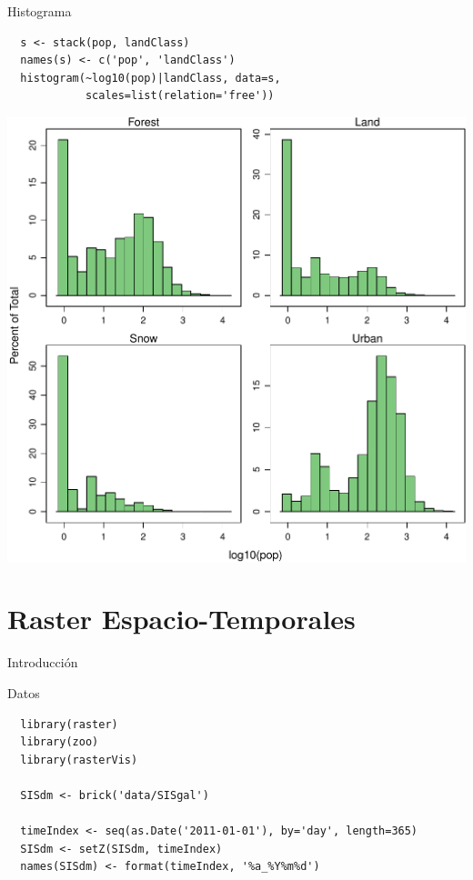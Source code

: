 \documentclass[xcolor={usenames,svgnames,dvipsnames}]{beamer}
\begin{document}
\begin{frame}[fragile,label=sec-3-7]{Histograma}
 \lstset{language=R,label= ,caption= ,numbers=none}
\begin{lstlisting}
  s <- stack(pop, landClass)
  names(s) <- c('pop', 'landClass')
  histogram(~log10(pop)|landClass, data=s,
            scales=list(relation='free'))
\end{lstlisting}

\includegraphics[width=.9\linewidth]{figs/histogramLandClass.pdf}
\end{frame}


\section{Raster Espacio-Temporales}
\label{sec-4}
\begin{frame}[label=sec-4-1]{Introducción}
\end{frame}

\begin{frame}[fragile,label=sec-4-2]{Datos}
 \lstset{language=R,label= ,caption= ,numbers=none}
\begin{lstlisting}
  library(raster)
  library(zoo)
  library(rasterVis)
  
  SISdm <- brick('data/SISgal')
  
  timeIndex <- seq(as.Date('2011-01-01'), by='day', length=365)
  SISdm <- setZ(SISdm, timeIndex)
  names(SISdm) <- format(timeIndex, '%a_%Y%m%d')
\end{lstlisting}
\end{frame}
\end{document}
